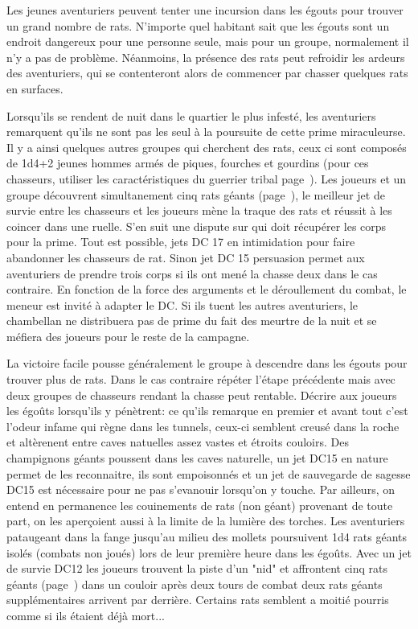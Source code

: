 Les jeunes aventuriers peuvent tenter une incursion dans les égouts pour trouver un grand nombre de rats.
N'importe quel habitant sait que les égouts sont un endroit dangereux pour une personne seule, mais pour 
un groupe, normalement il n'y a pas de problème. Néanmoins, la présence des rats peut refroidir les ardeurs 
des aventuriers, qui se contenteront alors de commencer par chasser quelques rats en surfaces.

Lorsqu'ils se rendent de nuit dans le quartier le plus infesté, les aventuriers remarquent qu'ils ne
sont pas les seul à la poursuite de cette prime miraculeurse. Il y a ainsi quelques autres groupes qui 
cherchent des rats, ceux ci sont composés de 1d4+2 jeunes hommes armés de piques, fourches et gourdins
(pour ces chasseurs, utiliser les caractéristiques du guerrier tribal page~\pageref{GuerrierTribal}). 
Les joueurs et un groupe découvrent simultanement cinq rats géants (page~\pageref{RatGeant}), le 
meilleur jet de survie entre les chasseurs et les joueurs mène la traque des rats et réussit à les coincer 
dans une ruelle. S'en suit une dispute sur qui doit récupérer les corps pour la prime. Tout est possible, 
jets DC 17 en intimidation pour faire abandonner les chasseurs de rat. Sinon jet DC 15 persuasion permet 
aux aventuriers de prendre trois corps si ils ont mené la chasse deux dans le cas contraire. En fonction 
de la force des arguments et le déroullement du combat, le meneur est invité à adapter le DC. Si ils tuent 
les autres aventuriers, le chambellan ne distribuera pas de prime du fait des meurtre de la nuit et se 
méfiera des joueurs pour le reste de la campagne.

La victoire facile pousse généralement le groupe à descendre dans les égouts pour trouver plus de rats. 
Dans le cas contraire répéter l'étape précédente mais avec deux groupes de chasseurs rendant la chasse peut 
rentable. Décrire aux joueurs les égoûts lorsqu'ils y pénètrent: ce qu'ils remarque en premier et avant 
tout c'est l'odeur infame qui règne dans les tunnels, ceux-ci semblent creusé dans la roche et altèrenent
entre caves natuelles assez vastes et étroits couloirs. Des champignons géants poussent dans les caves
naturelle, un jet DC15 en nature permet de les reconnaitre, ils sont empoisonnés et un jet de sauvegarde 
de sagesse DC15 est nécessaire pour ne pas s'evanouir lorsqu'on y touche. Par ailleurs, on entend en 
permanence les couinements de rats (non géant) provenant de toute part, on les aperçoient aussi à la 
limite de la lumière des torches. Les aventuriers pataugeant dans la fange jusqu'au milieu des mollets
poursuivent 1d4 rats géants isolés (combats non joués) lors de leur première heure dans les égoûts. Avec 
un jet de survie DC12 les joueurs trouvent la piste d'un "nid" et affrontent cinq rats géants 
(page~\pageref{RatGeant}) dans un couloir après deux tours de combat deux rats géants supplémentaires
arrivent par derrière. Certains rats semblent a moitié pourris comme si ils étaient déjà mort...

